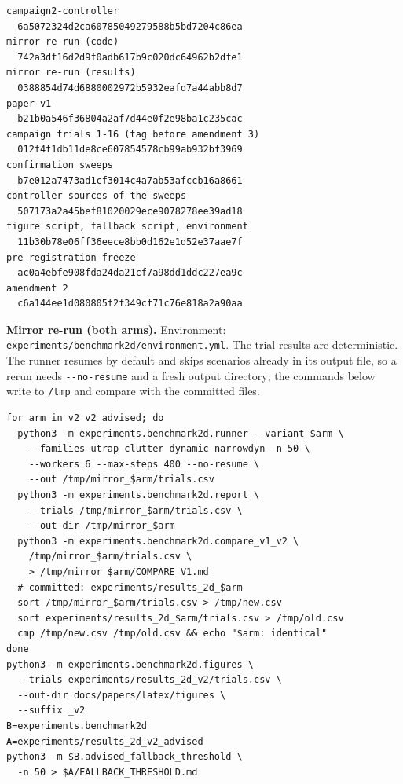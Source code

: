 \documentclass[journal]{IEEEtran}
\begin{document}
{\scriptsize
\begin{verbatim}
campaign2-controller
  6a5072324d2ca60785049279588b5bd7204c86ea
mirror re-run (code)
  742a3df16d2d9f0adb617b9c020dc64962b2dfe1
mirror re-run (results)
  0388854d74d6880002972b5932eafd7a44abb8d7
paper-v1
  b21b0a546f36804a2af7d44e0f2e98ba1c235cac
campaign trials 1-16 (tag before amendment 3)
  012f4f1db11de8ce607854578cb99ab932bf3969
confirmation sweeps
  b7e012a7473ad1cf3014c4a7ab53afccb16a8661
controller sources of the sweeps
  507173a2a45bef81020029ece9078278ee39ad18
figure script, fallback script, environment
  11b30b78e06ff36eece8bb0d162e1d52e37aae7f
pre-registration freeze
  ac0a4ebfe908fda24da21cf7a98dd1ddc227ea9c
amendment 2
  c6a144ee1d080805f2f349cf71c76e818a2a90aa
\end{verbatim}
}

\textbf{Mirror re-run (both arms).} Environment: \texttt{experiments/benchmark2d/environment.yml}.
The trial results are deterministic. The runner resumes by default and skips scenarios already
in its output file, so a rerun needs \texttt{-{}-no-resume} and a fresh output directory; the
commands below write to \texttt{/tmp} and compare with the committed files.

{\scriptsize
\begin{verbatim}
for arm in v2 v2_advised; do
  python3 -m experiments.benchmark2d.runner --variant $arm \
    --families utrap clutter dynamic narrowdyn -n 50 \
    --workers 6 --max-steps 400 --no-resume \
    --out /tmp/mirror_$arm/trials.csv
  python3 -m experiments.benchmark2d.report \
    --trials /tmp/mirror_$arm/trials.csv \
    --out-dir /tmp/mirror_$arm
  python3 -m experiments.benchmark2d.compare_v1_v2 \
    /tmp/mirror_$arm/trials.csv \
    > /tmp/mirror_$arm/COMPARE_V1.md
  # committed: experiments/results_2d_$arm
  sort /tmp/mirror_$arm/trials.csv > /tmp/new.csv
  sort experiments/results_2d_$arm/trials.csv > /tmp/old.csv
  cmp /tmp/new.csv /tmp/old.csv && echo "$arm: identical"
done
python3 -m experiments.benchmark2d.figures \
  --trials experiments/results_2d_v2/trials.csv \
  --out-dir docs/papers/latex/figures \
  --suffix _v2
B=experiments.benchmark2d
A=experiments/results_2d_v2_advised
python3 -m $B.advised_fallback_threshold \
  -n 50 > $A/FALLBACK_THRESHOLD.md
\end{verbatim}
}
\end{document}

